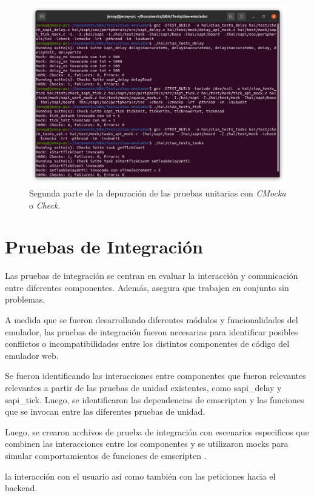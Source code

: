 \begin{figure}[ht]
	\centering
	\includegraphics[scale=.27]{./Figures/PruebasUnidad2.png}
	\caption{Segunda parte de la depuración de las pruebas unitarias con \textit{CMocka} o \textit{Check}.}
	\label{fig:PruebasUnidad2}
\end{figure}
 

\section{Pruebas de Integración} 
\label{subsec:Pruebas de Integración}

Las pruebas de integración se centran en evaluar la interacción y comunicación entre diferentes componentes. Además, asegura que trabajen en conjunto sin problemas.

A medida que se fueron desarrollando diferentes módulos y funcionalidades del emulador, las pruebas de integración fueron necesarias para identificar posibles conflictos o incompatibilidades entre los distintos componentes de código del emulador web.

Se fueron identificando las interacciones entre componentes que fueron relevantes relevantes a partir de las pruebas de unidad existentes, como sapi\_delay y sapi\_tick. Luego, se identificaron las dependencias de emscripten y las funciones que se invocan entre las diferentes pruebas de unidad.

Luego, se crearon archivos de prueba de integración con escenarios especificos que  combinen las interacciones entre los componentes y se utilizaron mocks para simular comportamientos de funciones de emscripten .

la interacción con el usuario así como también con las peticiones hacia el backend.

